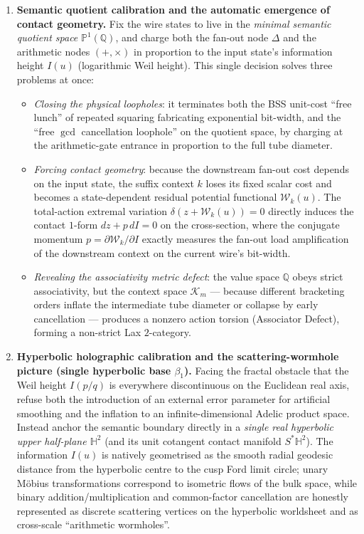 \documentclass[11pt,a4paper]{article}
\theoremstyle{definition}
\theoremstyle{remark}
\newcommand{\HH}{\mathbb{H}}
\newcommand{\PP}{\mathbb{P}}
\newcommand{\QQ}{\mathbb{Q}}
\newcommand{\cA}{\mathcal{A}}
\newcommand{\cK}{\mathcal{K}}
\newcommand{\cW}{\mathcal{W}}
\begin{document}
\begin{enumerate}
the nonlinear language: only when the history action $\cA(f)$ preparing some
state exceeds its instantaneous fan-out cost $c_\Delta(u)$ does the system
condense a high-curvature DAG sharing hub (corresponding to a two-dimensional
worldsheet handle, genus $g \ge 1$); shallow trivial computations
($\cA(f) < c_\Delta(u)$) spontaneously crack back into zero-curvature local pure
trees ($g = 0$).
\item \textbf{Semantic quotient calibration and the automatic emergence of
contact geometry.}  Fix the wire states to live in the \emph{minimal semantic
quotient space} $\PP^1(\QQ)$, and charge both the fan-out node $\Delta$ and the
arithmetic nodes $(+, \times)$ in proportion to the input state's information
height $I(u)$ (logarithmic Weil height).  This single decision solves three
problems at once:
\begin{itemize}
\item \emph{Closing the physical loopholes}: it terminates both the BSS
unit-cost ``free lunch'' of repeated squaring fabricating exponential bit-width,
and the ``free $\gcd$ cancellation loophole'' on the quotient space, by charging
at the arithmetic-gate entrance in proportion to the full tube diameter.
\item \emph{Forcing contact geometry}: because the downstream fan-out cost
depends on the input state, the suffix context $k$ loses its fixed scalar cost
and becomes a state-dependent residual potential functional $\cW_k(u)$.  The
total-action extremal variation $\delta(z + \cW_k(u)) = 0$ directly induces the
contact $1$-form $dz + p\,dI = 0$ on the cross-section, where the conjugate
momentum $p = \partial \cW_k / \partial I$ exactly measures the fan-out load
amplification of the downstream context on the current wire's bit-width.
\item \emph{Revealing the associativity metric defect}: the value space $\QQ$
obeys strict associativity, but the context space $\cK_m$ --- because different
bracketing orders inflate the intermediate tube diameter or collapse by early
cancellation --- produces a nonzero action torsion (Associator Defect), forming a
non-strict Lax $2$-category.
\end{itemize}
\item \textbf{Hyperbolic holographic calibration and the
scattering-wormhole picture (single hyperbolic base $\beta_1$).}  Facing the
fractal obstacle that the Weil height $I(p/q)$ is everywhere discontinuous on the
Euclidean real axis, refuse both the introduction of an external error parameter
for artificial smoothing and the inflation to an infinite-dimensional Adelic
product space.  Instead anchor the semantic boundary directly in a \emph{single
real hyperbolic upper half-plane $\HH^2$} (and its unit cotangent contact
manifold $S^*\HH^2$).  The information $I(u)$ is natively geometrised as the
smooth radial geodesic distance from the hyperbolic centre to the cusp Ford limit
circle; unary M\"obius transformations correspond to isometric flows of the bulk
space, while binary addition/multiplication and common-factor cancellation are
honestly represented as discrete scattering vertices on the hyperbolic worldsheet
and as cross-scale ``arithmetic wormholes''.
\end{enumerate}
\end{document}
